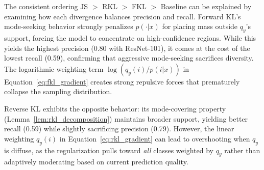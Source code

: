 \documentclass{article}
\begin{document}
The consistent ordering JS $>$ RKL $>$ FKL $>$ Baseline can be explained by examining how each divergence balances precision and recall. Forward KL's mode-seeking behavior strongly penalizes $p(\cdot|x)$ for placing mass outside $q_y$'s support, forcing the model to concentrate on high-confidence regions. While this yields the highest precision (0.80 with ResNet-101), it comes at the cost of the lowest recall (0.59), confirming that aggressive mode-seeking sacrifices diversity. The logarithmic weighting term $\log(q_y(i)/p(i|x))$ in Equation~\eqref{eq:fkl_gradient} creates strong repulsive forces that prematurely collapse the sampling distribution.

Reverse KL exhibits the opposite behavior: its mode-covering property (Lemma~\ref{lem:rkl_decomposition}) maintains broader support, yielding better recall (0.59) while slightly sacrificing precision (0.79). However, the linear weighting $q_y(i)$ in Equation~\eqref{eq:rkl_gradient} can lead to overshooting when $q_y$ is diffuse, as the regularization pulls toward \emph{all} classes weighted by $q_y$ rather than adaptively moderating based on current prediction quality.
\end{document}
